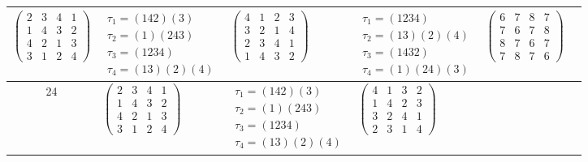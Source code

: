 \begin{longtable}{|c|p{2.7cm}|p{2.7cm}|p{2.7cm}|p{2.7cm}|p{2.7cm}|}
    $\begin{pmatrix} 2 & 3 & 4 & 1 \\ 1 & 4 & 3 & 2 \\ 4 & 2 & 1 & 3 \\ 3 & 1 & 2 & 4 \end{pmatrix}$               &
    $\begin{array}{l}\tau_{1}=(142)(3)\\ \tau_{2}=(1)(243)\\ \tau_{3}=(1234)\\ \tau_{4}=(13)(2)(4)\end{array}$     &
    $\begin{pmatrix} 4 & 1 & 2 & 3 \\ 3 & 2 & 1 & 4 \\ 2 & 3 & 4 & 1 \\ 1 & 4 & 3 & 2 \end{pmatrix}$               &
    $\begin{array}{l}\tau_{1}=(1234)\\ \tau_{2}=(13)(2)(4)\\ \tau_{3}=(1432)\\ \tau_{4}=(1)(24)(3)\end{array}$     &
    $\begin{pmatrix} 6 & 7 & 8 & 7 \\ 7 & 6 & 7 & 8 \\ 8 & 7 & 6 & 7 \\ 7 & 8 & 7 & 6 \end{pmatrix}$                                                                                           \\
    \hline
    24                                                                                                             &
    $\begin{pmatrix} 2 & 3 & 4 & 1 \\ 1 & 4 & 3 & 2 \\ 4 & 2 & 1 & 3 \\ 3 & 1 & 2 & 4 \end{pmatrix}$               &
    $\begin{array}{l}\tau_{1}=(142)(3)\\ \tau_{2}=(1)(243)\\ \tau_{3}=(1234)\\ \tau_{4}=(13)(2)(4)\end{array}$     &
    $\begin{pmatrix} 4 & 1 & 3 & 2 \\ 1 & 4 & 2 & 3 \\ 3 & 2 & 4 & 1 \\ 2 & 3 & 1 & 4 \end{pmatrix}$               &

\end{longtable}
